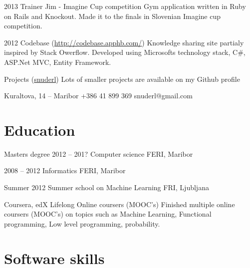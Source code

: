 \documentclass{tccv}
\begin{document}
\begin{yearlist}

\item{2013}
     {Trainer Jim - Imagine Cup competition}
     {Gym application written in Ruby on Rails and Knockout. Made it to the finals in Slovenian Imagine cup competition.}

\item{2012}
     {Codebase (\href{http://codebase.apphb.com/}{http://codebase.apphb.com/})}
     {Knowledge sharing site partialy inspired by Stack Owerflow. Developed using Microsofts technology stack, C\#, ASP.Net MVC, Entity Framework.}

\item{}
     {Projects (\href{https://github.com/snuderl}{snuderl})}
     {Lots of smaller projects are available on my Github profile}

\end{yearlist}




\personal
    {Kuraltova, 14 -- Maribor}
    {+386 41 899 369}
    {snuderl@gmail.com}
    


\section{Education}

\begin{yearlist}

\item[Masters degree]{2012 -- 201?}
     {Computer science}
     {FERI, Maribor}

\item{2008 -- 2012}
     {Informatics}
     {FERI, Maribor}
     
\item{Summer 2012}
    {Summer school on Machine Learning}
    {FRI, Ljubljana}
     
\item[Coursera, edX]
    {Lifelong}
    {Online coursers (MOOC's)}
    {Finished multiple online coursers (MOOC's) on topics such as Machine Learning, Functional programming, Low level programming, probability.}

\end{yearlist} 


\section{Software skills}
\end{document}
